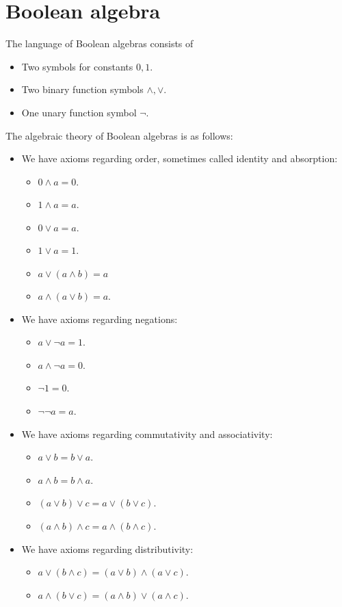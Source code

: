 \documentclass{../util/zariski-small}
\begin{document}
\section{Boolean algebra}
\begin{definition}
  The language of Boolean algebras consists of
  \begin{itemize}
    \item Two symbols for constants $0,1$. 
    \item Two binary function symbols $\wedge, \vee$.
    \item One unary function symbol $\neg$. 
  \end{itemize}
\end{definition}
\begin{definition}
  The algebraic theory of Boolean algebras is as follows:
  \begin{itemize}
    \item We have axioms regarding order, sometimes called identity and absorption:
    \begin{itemize}
      \item $0 \wedge a = 0$. 
      \item $1 \wedge a = a$. 
      \item $0 \vee a = a$. 
      \item $1 \vee a = 1$. 
      \item $a \vee (a \wedge b) = a$
      \item $a \wedge (a \vee b) = a$. 
    \end{itemize}
    \item We have axioms regarding negations:
      \begin{itemize}
        \item $a \vee \neg a = 1$. 
        \item $a \wedge \neg a = 0$. 
        \item $\neg 1 = 0$. 
        \item $\neg \neg a = a$. 
      \end{itemize}
    \item We have axioms regarding commutativity and associativity:
      \begin{itemize}
        \item $a \vee b = b \vee a$. 
        \item $a \wedge b = b \wedge a$. 
        \item $(a \vee b) \vee c = a \vee (b \vee c)$. 
        \item $(a \wedge b) \wedge c = a \wedge (b \wedge c)$. 
      \end{itemize}
    \item We have axioms regarding distributivity:
      \begin{itemize}
        \item $a \vee (b \wedge c) = ( a \vee b) \wedge (a \vee c)$. 
        \item $a \wedge (b \vee c) = (a \wedge b) \vee ( a\wedge c)$. 
      \end{itemize}
  \end{itemize}
\end{definition}
\end{document}
